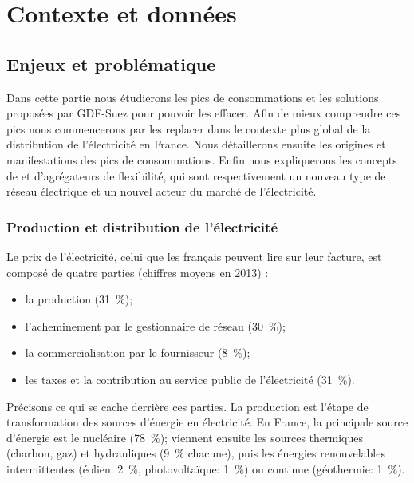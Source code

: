 \section{Contexte et données}

\subsection{Enjeux et problématique}

Dans cette partie nous étudierons les pics de consommations et les solutions proposées par GDF-Suez pour pouvoir les effacer. Afin de mieux comprendre ces pics nous commencerons par les replacer dans le contexte plus global de la distribution de l'électricité en France. Nous détaillerons ensuite les origines et manifestations des pics de consommations. Enfin nous expliquerons les concepts de \smartgrid{} et d'agrégateurs de flexibilité, qui sont respectivement un nouveau type de réseau électrique et un nouvel acteur du marché de l'électricité.


\subsubsection{Production et distribution de l'électricité}

Le prix de l'électricité, celui que les français peuvent lire sur leur facture, est composé de quatre parties (chiffres moyens en 2013) \cite{coutElec}:
\begin{itemize}
	\item la production (\SI{31}{\percent});
	\item l'acheminement par le gestionnaire de réseau (\SI{30}{\percent});
	\item la commercialisation par le fournisseur (\SI{8}{\percent});
	\item les taxes et la contribution au service public de l'électricité (\SI{31}{\percent}).
\end{itemize}

\bigskip

Précisons ce qui se cache derrière ces parties.
La production est l'étape de transformation des sources d'énergie en électricité.
En France, la principale source d'énergie est le nucléaire (\SI{78}{\percent}); viennent ensuite les sources thermiques (charbon, gaz) et hydrauliques (\SI{9}{\percent} chacune), puis les énergies renouvelables intermittentes (éolien: \SI{2}{\percent}, photovoltaïque: \SI{1}{\percent}) ou continue (géothermie: \SI{1}{\percent}).


